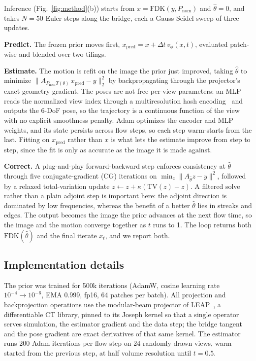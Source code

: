 \documentclass[11pt]{article}
\newcommand{\FDK}{\mathrm{FDK}}
\newcommand{\thetahat}{\hat\theta}
\newcommand{\Pnom}{P_{\mathrm{nom}}}
\begin{document}
Inference (Fig.~\ref{fig:method}(b)) starts from $x = \FDK(y,\Pnom)$ and $\thetahat = 0$, and
takes $N{=}50$ Euler steps along the bridge, each a Gauss-Seidel sweep of three updates.

\textbf{Predict.} The frozen prior moves first, $x_{\mathrm{pred}} = x + \Delta t\,
v_\phi(x,t)$, evaluated patch-wise and blended over two tilings.

\textbf{Estimate.} The motion is refit on the image the prior just improved, taking
$\thetahat$ to minimize $\|A_{\Pnom T(\theta)}\,x_{\mathrm{pred}} - y\|_2^2$ by
backpropagating through the projector's exact geometry gradient. The poses are not free
per-view parameters: an MLP reads the normalized view index through a multiresolution hash
encoding~\cite{mueller22} and outputs the 6-DoF pose, so the trajectory is a continuous
function of the view with no explicit smoothness penalty. Adam optimizes the encoder and MLP
weights, and its state persists across flow steps, so each step warm-starts from the last.
Fitting on $x_{\mathrm{pred}}$ rather than $x$ is what lets the estimate improve from step to
step, since the fit is only as accurate as the image it is made against.

\textbf{Correct.} A plug-and-play forward-backward step enforces consistency at $\thetahat$
through five conjugate-gradient (CG) iterations on $\min_z \|A_{\thetahat}z - y\|^2$,
followed by a relaxed total-variation update $z \leftarrow z + \kappa(\mathrm{TV}(z) - z)$. A
filtered solve rather than a plain adjoint step is important here: the adjoint direction is
dominated by low frequencies, whereas the benefit of a better $\thetahat$ lies in streaks and
edges. The output becomes the image the prior advances at the next flow time, so the image
and the motion converge together as $t$ runs to 1. The loop returns both $\FDK(\thetahat)$
and the final iterate $x_t$, and we report both.

\subsection{Implementation details}
\label{sec:impl}

The prior was trained for 500k iterations (AdamW, cosine learning rate
$10^{-4}\!\to\!10^{-6}$, EMA 0.999, fp16, 64 patches per batch). All projection and
backprojection operations use the modular-beam projector of LEAP~\cite{leap23}, a
differentiable CT library, pinned to its Joseph kernel so that a single operator serves
simulation, the estimator gradient and the data step; the bridge tangent and the pose gradient
are exact derivatives of that same kernel. The estimator runs 200 Adam iterations per flow
step on 24 randomly drawn views, warm-started from the previous step, at half volume
resolution until $t=0.5$.
\end{document}
